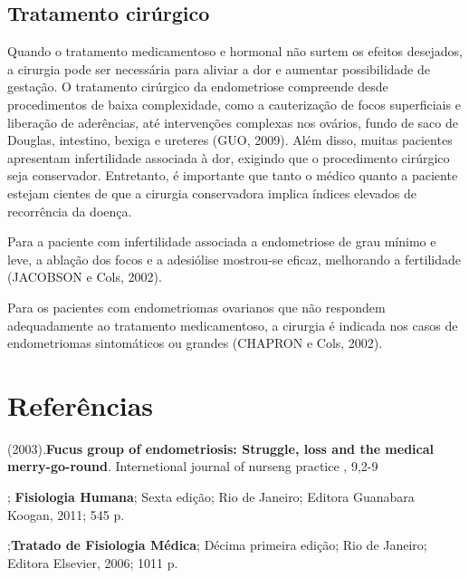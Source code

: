 \documentclass[12pt]{article} %
\begin{document}
\subsection{Tratamento cirúrgico}

Quando o tratamento medicamentoso e hormonal não surtem os efeitos
desejados, a cirurgia pode ser necessária para aliviar a dor e
aumentar possibilidade de gestação.  O tratamento cirúrgico da
endometriose compreende desde procedimentos de baixa complexidade,
como a cauterização de focos superficiais e liberação de aderências, até
intervenções complexas nos ovários, fundo de saco de Douglas,
intestino, bexiga e ureteres (GUO, 2009). Além disso, muitas pacientes
apresentam infertilidade associada à dor, exigindo que o procedimento
cirúrgico seja conservador. Entretanto, é importante que tanto o
médico quanto a paciente estejam cientes de que a cirurgia
conservadora implica índices elevados de recorrência da doença. %

Para a paciente com infertilidade associada a endometriose de grau
mínimo e leve, a ablação dos focos e a adesiólise mostrou-se eficaz,
melhorando a fertilidade (JACOBSON e Cols, 2002).

Para os pacientes com endometriomas ovarianos que não respondem
adequadamente ao tratamento medicamentoso, a cirurgia é indicada nos
casos de endometriomas sintomáticos ou grandes (CHAPRON e Cols, 2002).


\section{Referências} 
\setlength{\parindent}{0pt}

(2003).\textbf{Fucus group of endometriosis: Struggle, loss and the medical merry-go-round}. Internetional journal of nurseng practice , 9,2-9

\vspace{0,5cm}

; \textbf{ Fisiologia Humana}; Sexta edição; Rio de Janeiro; Editora Guanabara Koogan, 2011; 545 p.

\vspace{0,5cm}

;\textbf{Tratado de Fisiologia Médica}; Décima primeira edição; Rio de Janeiro; Editora Elsevier, 2006; 1011 p.

\vspace{0,5cm}
\end{document}
